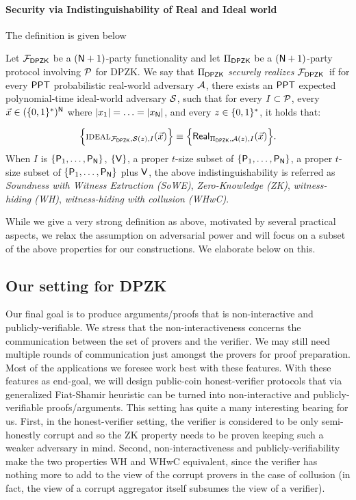 \paragraph{Security via Indistinguishability of Real and Ideal world} The definition is given below
\begin{definition}
Let $\mathcal{F}_{\mathsf{DPZK}}$ be a $(\mathsf{N}+1)$-party  functionality and let $\Pi_{\mathsf{DPZK}}$ be a $(\mathsf{N}+1)$-party protocol involving $\mathcal{P}$ for DPZK. We say that  $\Pi_{\mathsf{DPZK}}$ {\em securely realizes} $\mathcal{F}_{\mathsf{DPZK}}$~if for every $\mathsf{PPT}$ probabilistic  real-world adversary $\mathcal{A}$, there exists an $\mathsf{PPT}$  expected polynomial-time ideal-world adversary $\mathcal{S}$, such that for every $I \subset \mathcal{P}$, every $\vec{x} \in (\{0,1\}^*)^{\mathsf{N}}$ where $\left\lvert x_1 \right\rvert = \ldots= \left\lvert x_{\mathsf{N}} \right\rvert$, and every $z \in \{0,1\}^*$, it holds that:
	
	$$\Big\{\textsc{ideal}_{\mathcal{F}_{\mathsf{DPZK}}, \mathcal{S}(z),I}(\vec{x}) \Big\} \equiv \Big\{ \mathsf{Real}_{\Pi_{\mathsf{DPZK}}, \mathcal{A}(z),I}(\vec{x}) \Big\}. $$
When $I$ is  $\{\mathsf{P}_1,\ldots,\mathsf{P}_{\mathsf{N}}\}$, $\{\mathsf{V}\}$, a proper $t$-size subset of $\{\mathsf{P}_1,\ldots,\mathsf{P}_{\mathsf{N}}\}$, a proper $t$-size subset of $\{\mathsf{P}_1,\ldots,\mathsf{P}_{\mathsf{N}}\}$ plus   $\mathsf{V}$, the above indistinguishability  is referred as {\em Soundness with Witness Extraction (SoWE)}, {\em Zero-Knowledge (ZK)}, {\em witness-hiding (WH)}, {\em witness-hiding with collusion (WHwC)}.   	
\end{definition}

While we give a very strong definition as above, motivated by several practical aspects, we relax the assumption on adversarial power and will focus on a subset of the above properties for our constructions. We elaborate below on this.

\subsection{Our setting for DPZK}
Our final goal is to produce arguments/proofs that is non-interactive and publicly-verifiable.  We stress that the non-interactiveness concerns the communication between the set of provers and the verifier. We may still need multiple rounds of communication just amongst the provers for proof preparation.   Most of the applications we foresee work best  with these features. With these features as end-goal, we  will design public-coin honest-verifier  protocols that via generalized Fiat-Shamir heuristic \cite{FS86, BCS16} can be turned into non-interactive and publicly-verifiable proofs/arguments. This setting has quite a many interesting bearing for us. First,   in the honest-verifier setting, the verifier is considered to be only semi-honestly corrupt and so the ZK property needs to be proven keeping such a weaker adversary in mind. Second,  non-interactiveness and publicly-verifiability make the two properties WH and WHwC equivalent, since the verifier has nothing more to add to the view of the corrupt provers in the case of collusion (in fact, the view of a corrupt aggregator itself subsumes the view of a verifier). 

